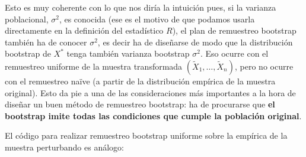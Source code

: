 \documentclass[]{book}
\theoremstyle{definition}
\theoremstyle{definition}
\theoremstyle{definition}
\theoremstyle{remark}
\begin{document}
Esto es muy coherente con lo que nos diría la intuición pues, si la
varianza poblacional, \(\sigma^2\), es conocida (ese es el motivo de que
podamos usarla directamente en la definición del estadístico \(R\)), el
plan de remuestreo bootstrap también ha de conocer \(\sigma^2\), es
decir ha de diseñarse de modo que la distribución bootstrap de
\(X^{\ast}\) tenga también varianza bootstrap \(\sigma^2\). Eso ocurre
con el remuestreo uniforme de la muestra transformada
\(\left( \tilde{X}_1,\ldots ,\tilde{X}_n \right)\), pero no ocurre con
el remuestreo naïve (a partir de la distribución empírica de la muestra
original). Esto da pie a una de las consideraciones más importantes a la
hora de diseñar un buen método de remuestreo bootstrap: ha de procurarse
que \textbf{el bootstrap imite todas las condiciones que cumple la
población original}.

El código para realizar remuestreo bootstrap uniforme sobre la empírica
de la muestra perturbando es análogo:
\end{document}
